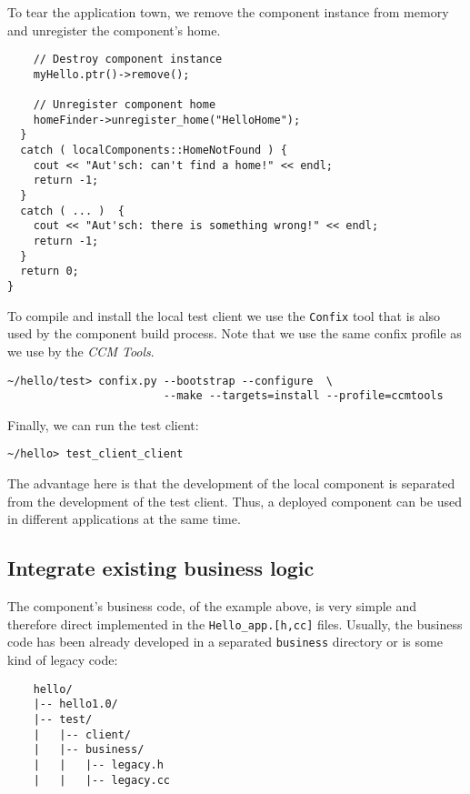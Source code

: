 \noindent
To tear the application town, we remove the component instance from memory
and unregister the component's home.
\begin{small}	
\begin{verbatim}      
    // Destroy component instance
    myHello.ptr()->remove();

    // Unregister component home
    homeFinder->unregister_home("HelloHome");
  }
  catch ( localComponents::HomeNotFound ) {
    cout << "Aut'sch: can't find a home!" << endl;
    return -1;
  }
  catch ( ... )  {
    cout << "Aut'sch: there is something wrong!" << endl;
    return -1;
  }
  return 0;
}
\end{verbatim}
\end{small}


\noindent
To compile and install the local test client we use the {\tt Confix} tool
that is also used by the component build process.
Note that we use the same confix profile as we use by the {\it CCM Tools}.
\begin{verbatim}
~/hello/test> confix.py --bootstrap --configure  \
                        --make --targets=install --profile=ccmtools
\end{verbatim}

\noindent
Finally, we can run the test client:
\begin{verbatim}
~/hello> test_client_client
\end{verbatim}
The advantage here is that the development of the 
local component is separated from the development of the test client.
Thus, a deployed component can be used in different applications at the same time.


\subsection{Integrate existing business logic}

The component's business code, of the example above, is very simple and therefore
direct implemented in the {\tt Hello\_app.[h,cc]} files.
Usually, the business code has been already developed in a separated 
{\tt business} directory or is some kind of legacy code: 
\begin{verbatim}
    hello/
    |-- hello1.0/
    |-- test/
    |   |-- client/
    |   |-- business/
    |   |   |-- legacy.h
    |   |   |-- legacy.cc
\end{verbatim}

